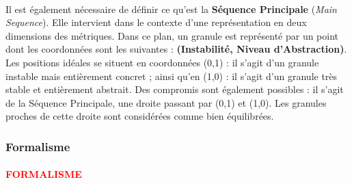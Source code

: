 \documentclass{scrartcl}
\newcommand{\TODO}[1] {
    \noindent \paragraph{\textcolor{red}{#1}}
}
\begin{document}
    \paragraph{}Il est également nécessaire de définir ce qu'est la \textbf{Séquence Principale} (\emph{Main Sequence}). Elle intervient dans le contexte d'une représentation en deux dimensions des métriques. Dans ce plan, un granule est représenté par un point dont les coordonnées sont les suivantes : \textbf{(Instabilité, Niveau d'Abstraction)}. Les positions idéales se situent en coordonnées (0,1) : il s'agit d'un granule instable mais entièrement concret ; ainsi qu'en (1,0) : il s'agit d'un granule très stable et entièrement abstrait. Des compromis sont également possibles : il s'agit de la Séquence Principale, une droite passant par (0,1) et (1,0). Les granules proches de cette droite sont considérées comme bien équilibrées.
    


\subsubsection{Formalisme}
\TODO{FORMALISME}



\end{document}
